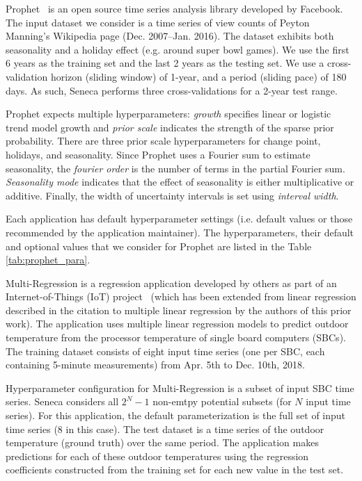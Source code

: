Prophet~\cite{ref:prophet} is an open source time series analysis library developed
by Facebook.  The input dataset we consider is a time series of view counts
of Peyton Manning's Wikipedia page (Dec. 2007--Jan. 2016).
The dataset exhibits both seasonality and a holiday effect (e.g. around 
super bowl games).  We use the first 6 years as the training set 
and the last 2 years as the testing set.  We use a cross-validation 
horizon (sliding window) of 1-year, and a period (sliding pace) 
of 180 days.  As such, Seneca performs three cross-validations for a 2-year test range.

Prophet expects multiple hyperparameters: \textit{growth} specifies linear or logistic trend model growth and \textit{prior scale} indicates the strength of the sparse prior probability. There are three prior scale hyperparameters for change point, holidays, and seasonality. Since Prophet uses a Fourier sum to estimate seasonality, the \textit{fourier order} is the number of terms in the partial Fourier sum. \textit{Seasonality mode} indicates that the effect of seasonality is either multiplicative or additive. Finally, the width of uncertainty intervals is set using \textit{interval width}.

Each application has default hyperparameter settings (i.e. default values or those recommended by the application maintainer). The hyperparameters, their default and optional values that we consider for Prophet are listed in the Table \ref{tab:prophet_para}.

Multi-Regression is a regression application developed by others as part of
an Internet-of-Things (IoT) project~\cite{iot-cpu} (which has been
extended from linear regression described in the citation 
to multiple linear regression by the authors of this prior work).
The application uses multiple linear regression models
to predict outdoor temperature from the processor 
temperature of single board computers (SBCs).  
The training dataset consists of eight input time 
series (one per SBC, each containing 
5-minute measurements) from Apr. 5th to Dec. 10th, 2018.

Hyperparameter configuration for Multi-Regression is a subset of input SBC time series.
Seneca considers all \texttt{$2^N - 1$} non-emtpy potential subsets (for $N$ input time series).
For this application, the default parameterization is the 
full set of input time series (8 in this case).
The test dataset is a time 
series of the outdoor temperature (ground truth) 
over the same period.  
The application makes 
predictions for each of these outdoor temperatures
using the regression coefficients constructed from the training set
for each new value in the test set.

